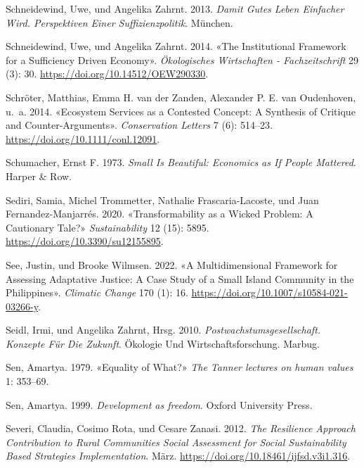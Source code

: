 \documentclass[
  nswissgerman,
  a4paper,
  openany]{book}
\newlength{\cslhangindent}
\newenvironment{CSLReferences}[2] %
 {\begin{list}{}{%
  \setlength{\itemindent}{0pt}
  \setlength{\leftmargin}{0pt}
  \setlength{\parsep}{0pt}
  \ifodd #1
   \setlength{\leftmargin}{\cslhangindent}
   \setlength{\itemindent}{-1\cslhangindent}
  \fi
  \setlength{\itemsep}{#2\baselineskip}}}
 {\end{list}}
\begin{document}
\begin{CSLReferences}{1}{1}
Schneidewind, Uwe, und Angelika Zahrnt. 2013. \emph{Damit Gutes {Leben}
Einfacher Wird. {Perspektiven} Einer {Suffizienzpolitik}}. München.

Schneidewind, Uwe, und Angelika Zahrnt. 2014. {«The Institutional
Framework for a Sufficiency Driven Economy»}. \emph{Ökologisches
Wirtschaften - Fachzeitschrift} 29 (3): 30.
\url{https://doi.org/10.14512/OEW290330}.

{Schröter, Matthias, Emma H. van der Zanden, Alexander P. E. van
Oudenhoven, u.~a.} 2014. {«Ecosystem {Services} as a {Contested
Concept}: A {Synthesis} of {Critique} and {Counter-Arguments}»}.
\emph{Conservation Letters} 7 (6): 514--23.
\url{https://doi.org/10.1111/conl.12091}.

Schumacher, Ernst F. 1973. \emph{Small Is {Beautiful}: {Economics} as If
{People Mattered}}. Harper \& Row.

Sediri, Samia, Michel Trommetter, Nathalie Frascaria-Lacoste, und Juan
Fernandez-Manjarrés. 2020. {«Transformability as a {Wicked Problem}: {A
Cautionary Tale}?»} \emph{Sustainability} 12 (15): 5895.
\url{https://doi.org/10.3390/su12155895}.

See, Justin, und Brooke Wilmsen. 2022. {«A Multidimensional Framework
for Assessing Adaptative Justice: A Case Study of a Small Island
Community in the {Philippines}»}. \emph{Climatic Change} 170 (1): 16.
\url{https://doi.org/10.1007/s10584-021-03266-y}.

Seidl, Irmi, und Angelika Zahrnt, Hrsg. 2010.
\emph{Postwachstumsgesellschaft. {Konzepte} F{ü}r Die {Zukunft}}.
{Ö}kologie Und {Wirtschaftsforschung}. Marbug.

Sen, Amartya. 1979. {«Equality of {What}?»} \emph{The Tanner lectures on
human values} 1: 353--69.

Sen, Amartya. 1999. \emph{Development as freedom}. Oxford University
Press.

Severi, Claudia, Cosimo Rota, und Cesare Zanasi. 2012. \emph{The
{Resilience Approach Contribution} to {Rural Communities Social
Assessment} for {Social Sustainability Based Strategies
Implementation}}. März. \url{https://doi.org/10.18461/ijfsd.v3i1.316}.


\end{CSLReferences}
\end{document}
